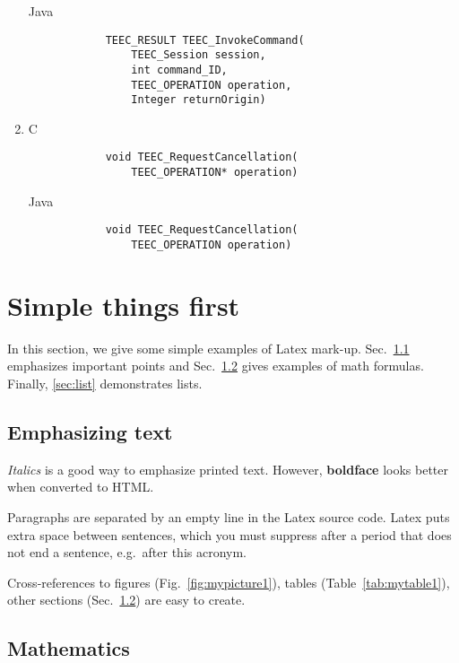 \documentclass{cseminar}
\begin{document}
\begin{enumerate}
		  Java
		  	\begin{lstlisting}
		  	TEEC_RESULT TEEC_InvokeCommand(
				TEEC_Session session,
				int command_ID,
				TEEC_OPERATION operation,
				Integer returnOrigin)
			\end{lstlisting}

			
	\item C
			\begin{lstlisting}
			void TEEC_RequestCancellation(
				TEEC_OPERATION* operation)
			\end{lstlisting}
		  
		  Java
		  	\begin{lstlisting}
		  	void TEEC_RequestCancellation(
				TEEC_OPERATION operation)
			\end{lstlisting}

\end{enumerate}


\iffalse

\section{Simple things first}

In this section, we give some simple examples of Latex mark-up.
Sec.~\ref{sec:emphasis} emphasizes important points and
Sec.~\ref{sec:math} gives examples of math formulas.
Finally, \ref{sec:list} demonstrates lists.




\subsection{Emphasizing text}
\label{sec:emphasis}

\textit{Italics} is a good way to emphasize printed text. However,
\textbf{boldface} looks better when converted to HTML.

Paragraphs are separated by an empty line in the Latex source code.
Latex puts extra space between sentences, which you must suppress
after a period that does not end a sentence, e.g.\ after this acronym.

Cross-references to figures (Fig.~\ref{fig:mypicture1}), tables
(Table~\ref{tab:mytable1}), other sections (Sec.~\ref{sec:math})
are easy to create. 




\subsection{Mathematics}
\label{sec:math}
\end{document}
